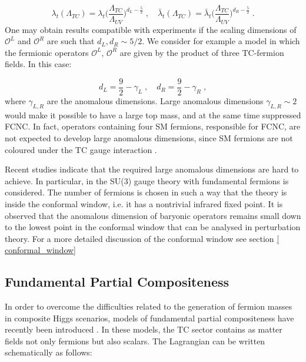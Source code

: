 \begin{equation}
\lambda_t (\Lambda_{TC}) =  \lambda_t \biggl( \frac{\Lambda_{TC}}{\Lambda_{UV}} \biggr)^{d_L - \frac{5}{2}} \; , \quad \bar \lambda_t (\Lambda_{TC}) =  \bar \lambda_t \biggl( \frac{\Lambda_{TC}}{\Lambda_{UV}} \biggr)^{d_R - \frac{5}{2}} \; .
\end{equation}
%
One may obtain results compatible with experiments if the scaling dimensions of $\mathcal O^L$ and $\mathcal O^R$ are such that $d_L , d_R \sim 5/2$. We consider for example a model in which the fermionic operators $\mathcal O^L$, $\mathcal O^R$ are given by the product of three TC-fermion fields. In this case:

\begin{equation}
d_L = \frac{9}{2} - \gamma_L \; , \quad d_R = \frac{9}{2} - \gamma_R   \; ,
\end{equation}
%
where $\gamma_{L,R}$ are the anomalous dimensions. Large anomalous dimensions $\gamma_{L,R} \sim 2$ would make it possible to have a large top mass, and at the same time suppressed FCNC. In fact, operators containing four SM fermions, responsible for FCNC, are not expected to develop large anomalous dimensions, since SM fermions are not coloured under the  TC gauge interaction \cite{Kaplan:1991dc}. 

Recent studies indicate that the required large anomalous dimensions are hard to achieve. In particular, in \cite{Pica:2016rmv} the SU(3) gauge theory with fundamental fermions is considered. The number of fermions is chosen in such a way that the theory is inside the conformal window, i.e. it has a nontrivial infrared fixed point. It is observed that the anomalous dimension of baryonic operators remains small down to the lowest point in the conformal window that can be analysed in perturbation theory. For a more detailed discussion of the conformal window see section \ref{ conformal_window}


\subsection{Fundamental Partial Compositeness}

In order to overcome the difficulties related to the generation of fermion masses in composite Higgs scenarios, models of fundamental partial compositeness have recently been introduced \cite{Sannino:2016sfx}. In these models, the TC sector contains as matter fields not only fermions but also scalars. The Lagrangian can be written schematically as follows:

